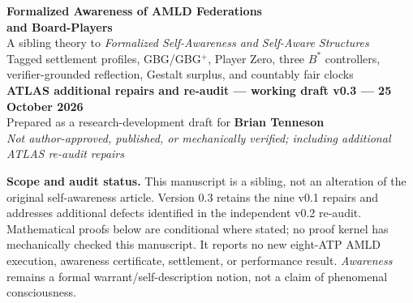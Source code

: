 \documentclass[10pt,letterpaper]{article}
\theoremstyle{remark}\newtheorem{remark}[definition]{Remark}
\begin{document}
\begin{center}
{\LARGE\bfseries\color{navy} Formalized Awareness of AMLD Federations\\[3pt] and Board-Players}\\[9pt]
{\large A sibling theory to \emph{Formalized Self-Awareness and Self-Aware Structures}}\\[8pt]
{\normalsize Tagged settlement profiles, GBG/GBG$^+$, Player Zero, three $B^*$ controllers,\\ verifier-grounded reflection, Gestalt surplus, and countably fair clocks}\\[10pt]
\textbf{ATLAS additional repairs and re-audit --- working draft v0.3 --- 25 October 2026}\\[3pt]
Prepared as a research-development draft for \textbf{Brian Tenneson}\\[3pt]
\textit{Not author-approved, published, or mechanically verified; including additional ATLAS re-audit repairs}
\end{center}
\vspace{0.35em}
\noindent\colorbox{navy!7}{\parbox{0.965\linewidth}{\small\textbf{Scope and audit status.} This manuscript is a sibling, not an alteration of the original self-awareness article. Version 0.3 retains the nine v0.1 repairs and addresses additional defects identified in the independent v0.2 re-audit. Mathematical proofs below are conditional where stated; no proof kernel has mechanically checked this manuscript. It reports no new eight-ATP AMLD execution, awareness certificate, settlement, or performance result. \emph{Awareness} remains a formal warrant/self-description notion, not a claim of phenomenal consciousness.}}
\end{document}
